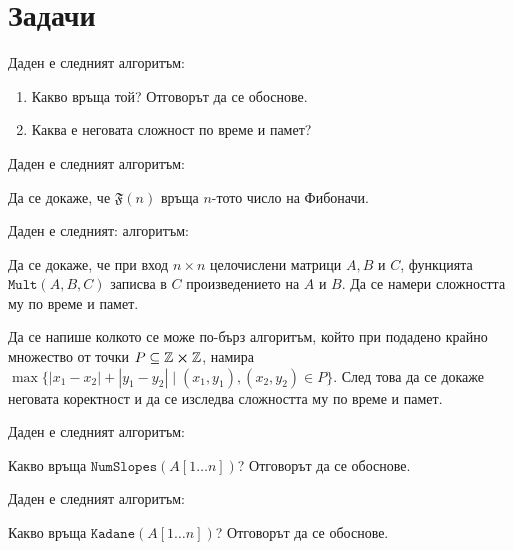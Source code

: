 \section{Задачи}

\begin{problem}
Даден е следният алгоритъм:


\begin{enumerate}
    \item Какво връща той? Отговорът да се обоснове.
    \item Каква е неговата сложност по време и памет?
\end{enumerate}
\end{problem}

\newpage

\begin{problem}
Даден е следният алгоритъм:


Да се докаже, че $\mathfrak{F}(n)$ връща $n$-тото число на Фибоначи.
\end{problem}

\begin{problem}
Даден е следният: алгоритъм:


Да се докаже, че при вход $n \times n$ целочислени матрици $A, B$ и $C$, функцията $\mathtt{Mult}(A, B, C)$ записва в $C$ произведението на $A$ и $B$.
Да се намери сложността му по време и памет.
\end{problem}

\begin{problem}
Да се напише колкото се може по-бърз алгоритъм, който при подадено крайно множество от точки $P \subseteq \mathbb{Z} \cross \mathbb{Z}$, намира $\max \{ |x_1 - x_2| + |y_1 - y_2| \mid (x_1, y_1), (x_2, y_2) \in P \}$.
След това да се докаже неговата коректност и да се изследва сложността му по време и памет.
\end{problem}

\newpage

\begin{problem}
Даден е следният алгоритъм:


Какво връща $\mathtt{NumSlopes}(A[1 \dots n])$?
Отговорът да се обоснове.
\end{problem}

\begin{problem}
Даден е следният алгоритъм:


Какво връща $\mathtt{Kadane}(A[1 \dots n])$?
Отговорът да се обоснове.
\end{problem}

